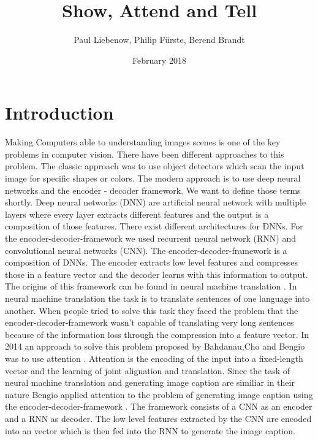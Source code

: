 \documentclass[12pt,letterpaper, twoside]{article}
\begin{document}
\begin{titlepage}
\title{Show, Attend and Tell}
\author{Paul Liebenow, Philip Fürste, Berend Brandt}
\date{February 2018}
\maketitle
\end{titlepage}
\newpage
\tableofcontents
\newpage
\section{Introduction}
Making Computers able to understanding images scenes is one of the key problems in computer vision. 
There have been different approaches to this problem. The classic approach was to use object detectors which scan the input image for specific shapes or colors.
The modern approach is to use deep neural networks and the encoder - decoder framework. 
We want to define those terms shortly.
Deep neural networks (DNN) are artificial neural network with multiple layers where every layer extracts different features and the output is a composition of those features. There exist different architectures for DNNs. For the encoder-decoder-framework we used recurrent neural network (RNN) and convolutional neural networks (CNN).
The encoder-decoder-framework is a composition of DNNs. The encoder extracts low level features and compresses those in a feature vector and the decoder learns with this information to output. The origins of this framework can be found in neural machine translation \cite{cho2014learning}. 
In neural machine translation the task is to translate sentences of one language into another. When people tried to solve this task they faced the problem that the encoder-decoder-framework wasn't capable of translating very long sentences because of the information loss through the compression into a feature vector.
In 2014 an approach to solve this problem proposed by Bahdanau,Cho and Bengio was to use attention \cite{bahdanau2014neural}. Attention is the encoding of the input into a fixed-length vector and the learning of joint alignation and translation.
Since the task of neural machine translation and generating image caption are similiar in their nature Bengio applied attention to the problem of generating image caption using the encoder-decoder-framework \cite{xu2015show}. The framework consists of a CNN as an encoder and a RNN as decoder. The low level features extracted by the CNN are encoded into an vector which is then fed into the RNN to generate the image caption. 
\end{document}
